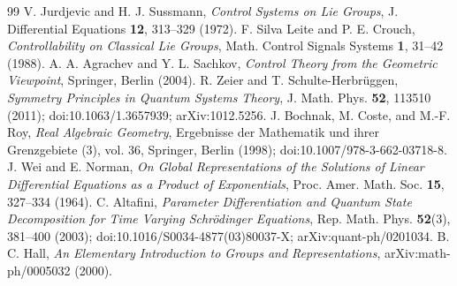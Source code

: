\documentclass[11pt,a4paper]{article}
\begin{document}
\begin{thebibliography}{99}
 V. Jurdjevic and H. J. Sussmann, \textit{Control Systems on Lie Groups}, J. Differential Equations \textbf{12}, 313--329 (1972).
 F. Silva Leite and P. E. Crouch, \textit{Controllability on Classical Lie Groups}, Math. Control Signals Systems \textbf{1}, 31--42 (1988).
 A. A. Agrachev and Y. L. Sachkov, \textit{Control Theory from the Geometric Viewpoint}, Springer, Berlin (2004).
 R. Zeier and T. Schulte-Herbr\"uggen, \textit{Symmetry Principles in Quantum Systems Theory}, J. Math. Phys. \textbf{52}, 113510 (2011); doi:10.1063/1.3657939; arXiv:1012.5256.
 J. Bochnak, M. Coste, and M.-F. Roy, \textit{Real Algebraic Geometry}, Ergebnisse der Mathematik und ihrer Grenzgebiete (3), vol. 36, Springer, Berlin (1998); doi:10.1007/978-3-662-03718-8.
 J. Wei and E. Norman, \textit{On Global Representations of the Solutions of Linear Differential Equations as a Product of Exponentials}, Proc. Amer. Math. Soc. \textbf{15}, 327--334 (1964).
 C. Altafini, \textit{Parameter Differentiation and Quantum State Decomposition for Time Varying Schr\"odinger Equations}, Rep. Math. Phys. \textbf{52}(3), 381--400 (2003); doi:10.1016/S0034-4877(03)80037-X; arXiv:quant-ph/0201034.
 B. C. Hall, \textit{An Elementary Introduction to Groups and Representations}, arXiv:math-ph/0005032 (2000).
\end{thebibliography}
\end{document}
